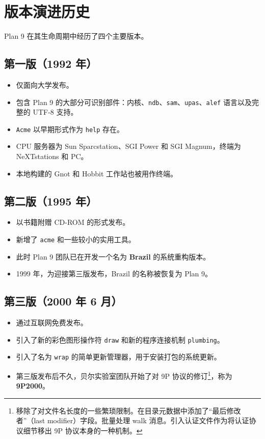 \documentclass[12pt,UTF8]{ctexbook}
\begin{document}
\section{版本演进历史}
	
Plan 9 在其生命周期中经历了四个主要版本。
	
\subsection{第一版（1992 年）}

\begin{itemize}
\item 仅面向大学发布。
\item 包含 Plan 9 的大部分可识别部件：内核、\texttt{ndb}、\texttt{sam}、\texttt{upas}、\texttt{alef} 语言以及完整的 UTF-8 支持。
\item \texttt{Acme} 以早期形式作为 \texttt{help} 存在。
\item CPU 服务器为 Sun Sparcstation、SGI Power 和 SGI Magnum，终端为 NeXTstations 和 PC。
\item 本地构建的 Gnot 和 Hobbit 工作站也被用作终端。
\end{itemize}
	
\subsection{第二版（1995 年）}

\begin{itemize}
\item 以书籍附赠 CD-ROM 的形式发布。
\item 新增了 \texttt{acme} 和一些较小的实用工具。
\item 此时 Plan 9 团队已在开发一个名为 \textbf{Brazil} 的系统重构版本。
\item 1999 年，为迎接第三版发布，Brazil 的名称被恢复为 Plan 9。
\end{itemize}

\subsection{第三版（2000 年 6 月）}

\begin{itemize}
\item 通过互联网免费发布。
\item 引入了新的彩色图形操作符 \texttt{draw} 和新的程序连接机制 \texttt{plumbing}。
\item 引入了名为 \texttt{wrap} 的简单更新管理器，用于安装打包的系统更新。
\item 第三版发布后不久，贝尔实验室团队开始了对 9P 协议的修订\footnote{移除了对文件名长度的一些繁琐限制。在目录元数据中添加了“最后修改者”（last modifier）字段。批量处理 walk 消息。引入认证文件作为将认证协议细节移出 9P 协议本身的一种机制。}，称为 \textbf{9P2000}。
\end{itemize}
	
\end{document}
